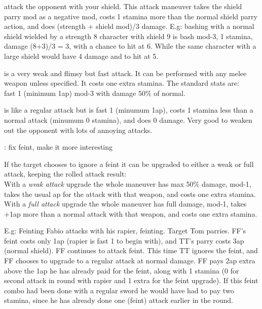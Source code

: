  attack the opponent with your shield. This attack maneuver takes the shield parry mod as a negative mod, costs 1 stamina more than the normal shield parry action, and does (strength + shield mod)/3 damage. E.g: bashing with a normal shield wielded by a strength 8 character with shield 9 is bash mod-3, 1 stamina, damage (8+3)/3 = 3, with a chance to hit at 6. While the same character with a large shield would have 4 damage and to hit at 5.


 is a very weak and flimsy but fast attack. It can be performed with any melee weapon unless specified. It costs one extra stamina. The standard stats are:\\
fast 1 (minimum 1ap) mod-3 with damage 50\% of normal.


 is like a regular attack but is fast 1 (minumum 1ap), costs 1 stamina less than a normal attack (minumum 0 stamina), and does 0 damage. Very good to weaken out the opponent with lots of annoying attacks.

\todo: fix feint, make it more interesting

If the target chooses to ignore a feint it can be upgraded to either a weak or full attack, keeping the rolled attack result:\\
With a \emph{weak attack} upgrade the whole maneuver has max 50\% damage, mod-1, takes the usual ap for the attack with that weapon, and costs one extra stamina.\\
With a \emph{full attack} upgrade the whole maneuver has full damage, mod-1, takes +1ap more than a normal attack with that weapon, and costs one extra stamina.

E.g: Feinting Fabio attacks with his rapier, feinting. Target Tom parries. FF's feint costs only 1ap (rapier is fast 1 to begin with), and TT's parry costs 3ap (normal shield). FF continues to attack feint. This time TT ignores the feint, and FF chooses to upgrade to a regular attack at normal damage. FF pays 2ap extra above the 1ap he has already paid for the feint, along with 1 stamina (0 for second attack in round with rapier and 1 extra for the feint upgrade). If this feint combo had been done with a regular sword he would have had to pay two stamina, since he has already done one (feint) attack earlier in the round.



